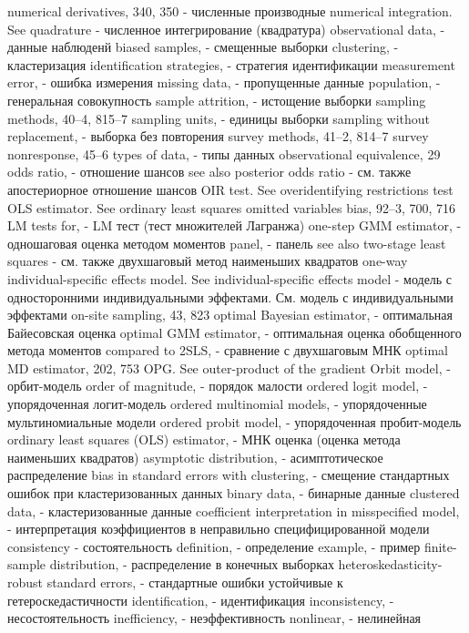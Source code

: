 numerical derivatives, 340, 350 - численные производные
numerical integration. See quadrature - численное интегрирование (квадратура)
observational data, - данные наблюденй
biased samples, - смещенные выборки
clustering, - кластеризация
identification strategies, - стратегия идентификации
measurement error, - ошибка измерения
missing data, - пропущенные данные
population, - генеральная совокупность
sample attrition, - истощение выборки
sampling methods, 40–4, 815–7 
sampling units, - единицы выборки
sampling without replacement, - выборка без повторения
survey methods, 41–2, 814–7
survey nonresponse, 45–6
types of data, - типы данных
observational equivalence, 29 
odds ratio, - отношение шансов
see also posterior odds ratio - см. также апостериорное отношение шансов
OIR test. See overidentifying restrictions test OLS estimator. See ordinary least squares omitted variables bias, 92–3, 700, 716
LM tests for, - LM тест (тест множителей Лагранжа)
one-step GMM estimator, - одношаговая оценка методом моментов
panel, - панель
see also two-stage least squares - см. также двухшаговый метод наименьших квадратов
one-way individual-specific effects model. See individual-specific effects model - модель с односторонними индивидуальными эффектами. См. модель с индивидуальными эффектами
on-site sampling, 43, 823
optimal Bayesian estimator, - оптимальная Байесовская оценка
optimal GMM estimator, - оптимальная оценка обобщенного метода моментов
compared to 2SLS, - сравнение с двухшаговым МНК
optimal MD estimator, 202, 753
OPG. See outer-product of the gradient
Orbit model, - орбит-модель
order of magnitude, - порядок малости
ordered logit model, - упорядоченная логит-модель
ordered multinomial models, - упорядоченные мультиномиальные модели
ordered probit model, - упорядоченная пробит-модель
ordinary least squares (OLS) estimator, - МНК оценка (оценка метода наименьших квадратов)
asymptotic distribution, - асимптотическое распределение
bias in standard errors with clustering, - смещение стандартных ошибок при кластеризованных данных
binary data, - бинарные данные
clustered data, - кластеризованные данные
coefficient interpretation in misspecified model, - интерпретация коэффициентов в неправильно специфицированной модели
consistency - состоятельность
definition, - определение
example, - пример
finite-sample distribution, - распределение в конечных выборках
heteroskedasticity-robust standard errors, - стандартные ошибки устойчивые к гетероскедастичности
identification, - идентификация
inconsistency, - несостоятельность
inefficiency, - неэффективность
nonlinear, - нелинейная
